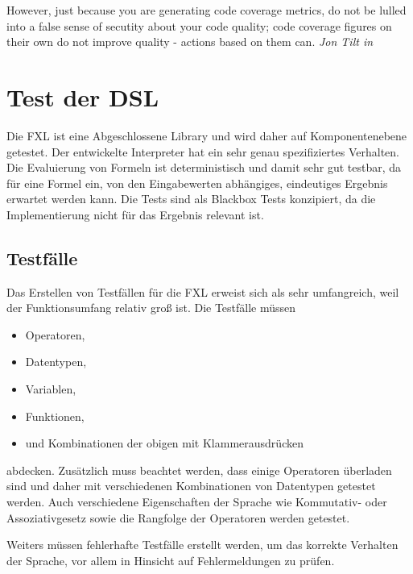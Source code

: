\begin{myquote}
 However, just because you are generating code coverage metrics, do not be lulled into a false sense of secutity about your code quality; code coverage figures on their own do not improve quality - actions based on them can. \emph{Jon Tilt in} \cite[S. 199]{JoWa09}
\end{myquote}


\section{Test der DSL}

Die FXL ist eine Abgeschlossene Library und wird daher auf Komponentenebene getestet. Der entwickelte Interpreter hat ein sehr genau spezifiziertes Verhalten. Die Evaluierung von Formeln ist deterministisch und damit sehr gut testbar, da für eine Formel ein, von den Eingabewerten abhängiges, eindeutiges Ergebnis erwartet werden kann. Die Tests sind als Blackbox Tests konzipiert, da die Implementierung nicht für das Ergebnis relevant ist.

\subsection{Testfälle}

Das Erstellen von Testfällen für die FXL erweist sich als sehr umfangreich, weil der Funktionsumfang relativ groß ist. Die Testfälle müssen

\begin{itemize}

 \item Operatoren,

 \item Datentypen,

 \item Variablen,

 \item Funktionen,

 \item und Kombinationen der obigen mit Klammerausdrücken
\end{itemize}

abdecken. Zusätzlich muss beachtet werden, dass einige Operatoren überladen sind und daher mit verschiedenen Kombinationen von Datentypen getestet werden. Auch verschiedene Eigenschaften der Sprache wie Kommutativ- oder Assoziativgesetz sowie die Rangfolge der Operatoren werden getestet.

Weiters müssen fehlerhafte Testfälle erstellt werden, um das korrekte Verhalten der Sprache, vor allem in Hinsicht auf Fehlermeldungen zu prüfen.


